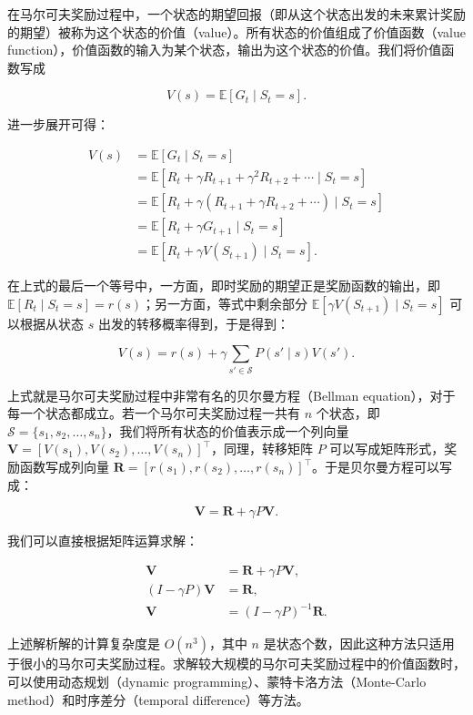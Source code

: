 在马尔可夫奖励过程中，一个状态的期望回报（即从这个状态出发的未来累计奖励的期望）被称为这个状态的价值（value）。所有状态的价值组成了价值函数（value function），价值函数的输入为某个状态，输出为这个状态的价值。我们将价值函数写成

\[
V(s)=\mathbb{E}[G_t\mid S_t=s].
\]

进一步展开可得：

\[
\begin{aligned}
V(s)
&=\mathbb{E}[G_t\mid S_t=s]\\
&=\mathbb{E}[R_t+\gamma R_{t+1}+\gamma^{2} R_{t+2}+\cdots\mid S_t=s]\\
&=\mathbb{E}[R_t+\gamma(R_{t+1}+\gamma R_{t+2}+\cdots)\mid S_t=s]\\
&=\mathbb{E}[R_t+\gamma G_{t+1}\mid S_t=s]\\
&=\mathbb{E}[R_t+\gamma V(S_{t+1})\mid S_t=s].
\end{aligned}
\]

在上式的最后一个等号中，一方面，即时奖励的期望正是奖励函数的输出，即 \(\mathbb{E}[R_t\mid S_t=s]=r(s)\)；另一方面，等式中剩余部分 \(\mathbb{E}[\gamma V(S_{t+1})\mid S_t=s]\) 可以根据从状态 \(s\) 出发的转移概率得到，于是得到：

\[
V(s)=r(s)+\gamma\sum_{s'\in\mathcal{S}}P(s'\mid s)V(s').
\]

上式就是马尔可夫奖励过程中非常有名的贝尔曼方程（Bellman equation），对于每一个状态都成立。若一个马尔可夫奖励过程一共有 \(n\) 个状态，即 \(\mathcal{S}=\{s_1,s_2,\ldots,s_n\}\)，我们将所有状态的价值表示成一个列向量 \(\mathbf{V}=[V(s_1),V(s_2),\ldots,V(s_n)]^{\top}\)，同理，转移矩阵 \(P\) 可以写成矩阵形式，奖励函数写成列向量 \(\mathbf{R}=[r(s_1),r(s_2),\ldots,r(s_n)]^{\top}\)。于是贝尔曼方程可以写成：

\[
\mathbf{V}=\mathbf{R}+\gamma P\mathbf{V}.
\]

我们可以直接根据矩阵运算求解：

\[
\begin{aligned}
\mathbf{V}&=\mathbf{R}+\gamma P\mathbf{V},\\
(I-\gamma P)\mathbf{V}&=\mathbf{R},\\
\mathbf{V}&=(I-\gamma P)^{-1}\mathbf{R}.
\end{aligned}
\]

上述解析解的计算复杂度是 \(O(n^{3})\)，其中 \(n\) 是状态个数，因此这种方法只适用于很小的马尔可夫奖励过程。求解较大规模的马尔可夫奖励过程中的价值函数时，可以使用动态规划（dynamic programming）、蒙特卡洛方法（Monte-Carlo method）和时序差分（temporal difference）等方法。

